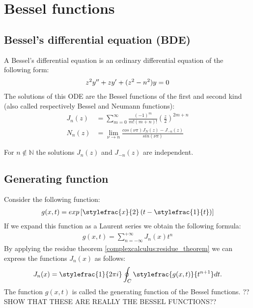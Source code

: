\chapter{Bessel functions}
\section{Bessel's differential equation (BDE)}

	A Bessel's differential equation is an ordinary differential equation of the following form:
	\begin{gather}\index{Bessel!differential equation}
        	\label{bessel:differential_equation}
		z^2y'' + zy' + (z^2 - n^2)y = 0
	\end{gather}
	The solutions of this ODE are the Bessel functions of the first and second kind (also called respectively Bessel and Neumann functions):
	\begin{align}
		\label{bessel:bessel_function}
        	J_n(z) &= \sum_{m = 0}^\infty\frac{(-1)^m}{m!(m + n)!}\left(\frac{z}{2}\right)^{2m + n}\\
		\label{bessel:neumann_function}
	        N_n(z) &= \lim_{\nu\rightarrow n}\frac{cos(\nu \pi)J_N(z) - J_{-n}(z)}{sin(\nu\pi)}
	\end{align}

	\begin{property}
		For $n\not\in\mathbb{N}$ the solutions $J_n(z)$ and $J_{-n}(z)$ are independent.
	\end{property}
    
\section{Generating function}
	
	Consider the following function:
	\begin{gather}\index{Bessel!generating function}
		\label{bessel:generating_function}
        	g(x, t) = exp\left[\stylefrac{x}{2}\left(t - \stylefrac{1}{t}\right)\right]
	\end{gather}
	If we expand this function as a Laurent series we obtain the following formula:
	\begin{gather}
		\label{bessel:generating_function_expansion}
        	g(x, t) = \sum_{n=-\infty}^{+\infty}J_n(x)t^n
	\end{gather}
	By applying the residue theorem \ref{complexcalculus:residue_theorem} we can express the functions $J_n(x)$ as follows:
	\begin{gather}
		\label{bessel:generating_function_integral}
        	J_n(x) = \stylefrac{1}{2\pi i}\oint_C\stylefrac{g(x, t)}{t^{n+1}}dt.
	\end{gather}
	The function $g(x, t)$ is called the generating function of the Bessel functions. ??SHOW THAT THESE ARE REALLY THE BESSEL FUNCTIONS??
    
